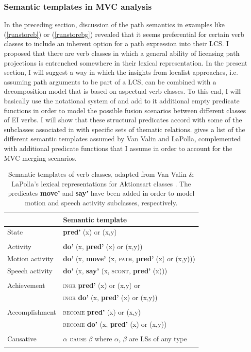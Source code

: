\subsubsection{Semantic templates in MVC analysis} \label{sec:sem-templates}

In the preceding section, discussion of the path semantics in examples like (\ref{runstoreb}) or (\ref{runstorebg}) revealed that it seems preferential for certain verb classes to include an inherent option for a path expression into their LCS. I proposed that there are verb classes in which a general ability of licensing path projections is entrenched somewhere in their lexical representation. In the present section, I will suggest a way in which the insights from localist approaches, i.e. assuming path arguments to be part of a LCS, can be combined with a decomposition model that is based on aspectual verb classes. To this end, I will basically use the notational system of \citet{van1997syntax} and add to it additional empty predicate functions in order to model the possible fusion scenarios between different classes of EI verbs. I will show that these structural predicates accord with some of the subclasses associated in \citet{van1997syntax} with specific sets of thematic relations.  gives a list of the different semantic templates assumed by Van Valin and LaPolla, complemented with additional predicate functions that I assume in order to account for the MVC merging scenarios.

\begin{table}
\begin{tabular}{ll}
\lsptoprule
\multicolumn{1}{l}{Verb class}&\multicolumn{1}{l}{Semantic template}\tabularnewline
\midrule
State&\textbf{pred'} (x) or (x,y)\tabularnewline\tabularnewline
Activity&\textbf{do'} (x, \textbf{pred'} (x) or (x,y))\tabularnewline
Motion activity&\textbf{do'} (x, \textbf{move'} (x, \textsc{path}, \textbf{pred'} (x) or (x,y)))\tabularnewline
Speech activity&\textbf{do'} (x, \textbf{say'} (x, \textsc{scont}, \textbf{pred'} (x)))\tabularnewline\tabularnewline
Achievement&\textsc{ingr} \textbf{pred'} (x) or (x,y) or\tabularnewline
&\textsc{ingr} \textbf{do'} (x, \textbf{pred'} (x) or (x,y))\tabularnewline\tabularnewline
Accomplishment&\textsc{become} \textbf{pred'} (x) or (x,y)\tabularnewline
&\textsc{become} \textbf{do'} (x, \textbf{pred'} (x) or (x,y))\tabularnewline\tabularnewline
Causative&$\alpha$ \textsc{cause} $\beta$ where $\alpha$, $\beta$ are LSs of any type\tabularnewline
\lspbottomrule
\end{tabular}
\caption[Semantic templates of verb classes, adapted from \citet{van1997syntax}]{Semantic templates of verb classes, adapted from Van Valin \& LaPolla's lexical representations for Aktionsart classes \citep[109]{van1997syntax}. The predicates \textbf{move'} and \textbf{say'} have been added in order to model motion and speech activity subclasses, respectively.}
\label{table:semtemp}
\end{table}

